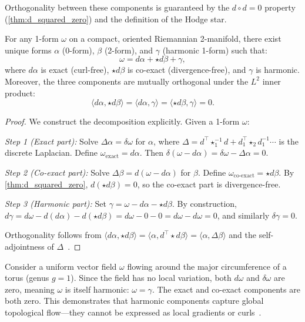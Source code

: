 Orthogonality between these components is guaranteed by the $d \circ d = 0$ property (\cref{thm:d_squared_zero}) and the definition of the Hodge star.

\begin{theorem}\label{thm:hodge_decomposition}
For any 1-form $\omega$ on a compact, oriented Riemannian 2-manifold, there exist unique forms $\alpha$ (0-form), $\beta$ (2-form), and $\gamma$ (harmonic 1-form) such that:
\[
\omega = d\alpha + \star d\beta + \gamma,
\]
where $d\alpha$ is exact (curl-free), $\star d\beta$ is co-exact (divergence-free), and $\gamma$ is harmonic. Moreover, the three components are mutually orthogonal under the $L^2$ inner product:
\[
\langle d\alpha, \star d\beta \rangle = \langle d\alpha, \gamma \rangle = \langle \star d\beta, \gamma \rangle = 0.
\]
\end{theorem}

\begin{proof}
We construct the decomposition explicitly. Given a 1-form $\omega$:

\emph{Step 1 (Exact part):} Solve $\Delta \alpha = \delta \omega$ for $\alpha$, where $\Delta = d^\top \star_1^{-1} d + d_1^\top \star_2 d_1^{-1} \cdots$ is the discrete Laplacian. Define $\omega_{\text{exact}} = d\alpha$. Then $\delta(\omega - d\alpha) = \delta\omega - \Delta\alpha = 0$.

\emph{Step 2 (Co-exact part):} Solve $\Delta \beta = d(\omega - d\alpha)$ for $\beta$. Define $\omega_{\text{co-exact}} = \star d\beta$. By \cref{thm:d_squared_zero}, $d(\star d\beta) = 0$, so the co-exact part is divergence-free.

\emph{Step 3 (Harmonic part):} Set $\gamma = \omega - d\alpha - \star d\beta$. By construction, $d\gamma = d\omega - d(d\alpha) - d(\star d\beta) = d\omega - 0 - 0 = d\omega - d\omega = 0$, and similarly $\delta\gamma = 0$.

Orthogonality follows from $\langle d\alpha, \star d\beta \rangle = \langle \alpha, d^\top \star d\beta \rangle = \langle \alpha, \Delta \beta \rangle$ and the self-adjointness of $\Delta$~\cite{tong2003}.
\end{proof}

\begin{example}\label{ex:hodge_decomposition_torus}
Consider a uniform vector field $\omega$ flowing around the major circumference of a torus (genus $g = 1$). Since the field has no local variation, both $d\omega$ and $\delta\omega$ are zero, meaning $\omega$ is itself harmonic: $\omega = \gamma$. The exact and co-exact components are both zero. This demonstrates that harmonic components capture global topological flow---they cannot be expressed as local gradients or curls~\cite{polthier2003}.
\end{example}

